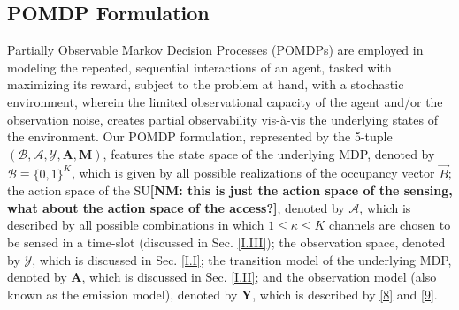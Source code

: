 \documentclass[12pt, draftcls, onecolumn]{IEEEtran}
\newcommand{\nm}[1]{{\color{blue}\bf{[NM: #1]}}}
\begin{document}
\subsection{POMDP Formulation}\label{II.0}
Partially Observable Markov Decision Processes (POMDPs) are employed in modeling the repeated, sequential interactions of an agent, tasked with maximizing its reward, subject to the problem at hand, with a stochastic environment, wherein the limited observational capacity of the agent and/or the observation noise, creates partial observability vis-\`{a}-vis the underlying states of the environment. Our POMDP formulation, represented by the 5-tuple $(\mathcal{B},\mathcal{A},\mathcal{Y},\mathbf{A},\mathbf{M})$, features the state space of the underlying MDP, denoted by $\mathcal{B}{\equiv}\{0,1\}^{K}$, which is given by all possible realizations of the occupancy vector $\vec{B}$; the action space of the SU\nm{this is just the action space of the sensing, what about the action space of the access?}, denoted by $\mathcal{A}$, which is described by all possible combinations in which $1{\leq}\kappa{\leq}K$ channels are chosen to be sensed in a time-slot (discussed in Sec. \ref{I.III}); the observation space, denoted by $\mathcal{Y}$, which is discussed in Sec. \ref{I.I}; the transition model of the underlying MDP, denoted by $\mathbf{A}$, which is discussed in Sec. \ref{I.II}; and the observation model (also known as the emission model), denoted by $\mathbf{Y}$, which is described by \eqref{8} and \eqref{9}.
\end{document}
